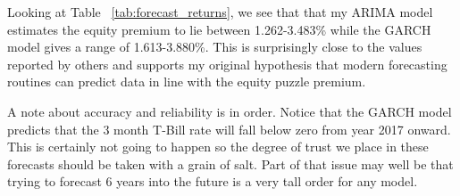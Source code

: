 \documentclass[a4paper, 11pt, twoside]{article}
\theoremstyle{definition} %
\numberwithin{equation}{section}
\begin{document}
  Looking at Table ~\ref{tab:forecast_returns}, we see that that my ARIMA model estimates the equity premium to lie between 1.262-3.483\% while the GARCH model gives a range of 1.613-3.880\%. This is surprisingly close to the values reported by others and supports my original hypothesis that modern forecasting routines can predict data in line with the equity puzzle premium.

  A note about accuracy and reliability is in order. Notice that the GARCH model predicts that the 3 month T-Bill rate will fall below zero from year 2017 onward. This is certainly not going to happen so the degree of trust we place in these forecasts should be taken with a grain of salt. Part of that issue may well be that trying to forecast 6 years into the future is a very tall order for any model.

\newpage

\end{document}
